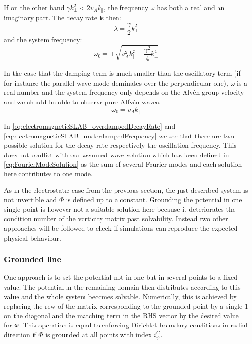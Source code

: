 If on the other hand $\gamma k_\perp^2 < 2v_Ak_\parallel$, the frequency $\omega$ has both a real and an imaginary part. The decay rate is then:
\begin{equation} 
	\lambda = \frac{\gamma}{2}k_\perp^2 \label{eq:electromagneticSLAB_underdampedDecayRate}
\end{equation}
and the system frequency: 
\begin{equation} 
	\omega_0 = \pm\sqrt{v_A^2k_\parallel^2 - \frac{\gamma^2}{4}k_\perp^4} \label{eq:electromagneticSLAB_underdampedFrequency}
\end{equation}

In the case that the damping term is much smaller than the oscillatory term (if for instance the parallel wave mode dominates over the perpendicular one), $\omega$ is a real number and the system frequency only depends on the Alvén group velocity and we should be able to observe pure Alfvén waves.
$$ \omega_0 = v_A k_\parallel$$

In \autoref{eq:electromagneticSLAB_overdampedDecayRate} and \autoref{eq:electromagneticSLAB_underdampedFrequency} we see that there are two possible solution for the decay rate respectively the oscillation frequency. This does not conflict with our assumed wave solution which has been defined in \autoref{eq:FourierModeSolution} as the sum of several Fourier modes and each solution here contributes to one mode. 
 
As in the electrostatic case from the previous section, the just described system is not invertible and $\Phi$ is defined up to a constant. Grounding the potential in one single point is however not a suitable solution here because it deteriorates the condition number of the vorticity matrix past solvability. Instead two other approaches will be followed to check if simulations can reproduce the expected physical behaviour. 

\subsubsection{Grounded line}
One approach is to set the potential not in one but in several points to a fixed value. The potential in the remaining domain then distributes according to this value and the whole system becomes solvable. Numerically, this is achieved by replacing the row of the matrix corresponding to the grounded point by a single 1 on the diagonal and the matching term in the RHS vector by the desired value for $\Phi$. This operation is equal to enforcing Dirichlet boundary conditions in radial direction if $\Phi$ is grounded at all points with index $i_\psi^G$. 

